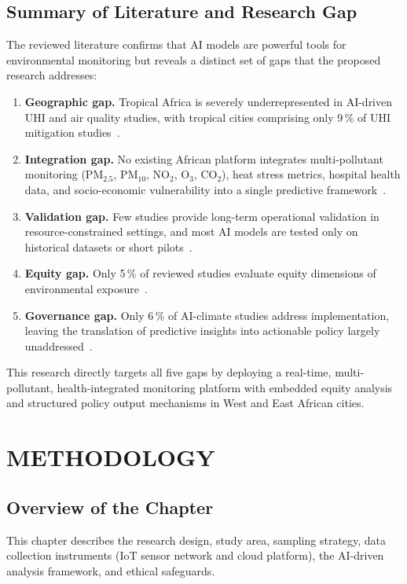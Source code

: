 \section{Summary of Literature and Research Gap}
The reviewed literature confirms that AI models are powerful tools for environmental monitoring but reveals a distinct set of gaps that the proposed research addresses:
\begin{enumerate}
  \item \textbf{Geographic gap.} Tropical Africa is severely underrepresented in AI-driven UHI and air quality studies, with tropical cities comprising only 9\,\% of UHI mitigation studies~\cite{gaur2026}.
  \item \textbf{Integration gap.} No existing African platform integrates multi-pollutant monitoring (PM$_{2.5}$, PM$_{10}$, NO$_2$, O$_3$, CO$_2$), heat stress metrics, hospital health data, and socio-economic vulnerability into a single predictive framework~\cite{bainomugisha2024}.
  \item \textbf{Validation gap.} Few studies provide long-term operational validation in resource-constrained settings, and most AI models are tested only on historical datasets or short pilots~\cite{ikegwu2026}.
  \item \textbf{Equity gap.} Only 5\,\% of reviewed studies evaluate equity dimensions of environmental exposure~\cite{gaur2026}.
  \item \textbf{Governance gap.} Only 6\,\% of AI-climate studies address implementation, leaving the translation of predictive insights into actionable policy largely unaddressed~\cite{mehryar2024}.
\end{enumerate}
This research directly targets all five gaps by deploying a real-time, multi-pollutant, health-integrated monitoring platform with embedded equity analysis and structured policy output mechanisms in West and East African cities.



\chapter{METHODOLOGY}

\section{Overview of the Chapter}
This chapter describes the research design, study area, sampling strategy, data collection instruments (IoT sensor network and cloud platform), the AI-driven analysis framework, and ethical safeguards.

